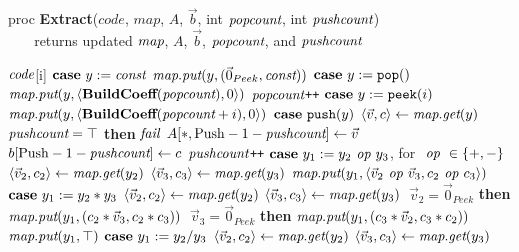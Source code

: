 \begin{algorithm}
proc {\bf Extract}($code$, $map$, $A$, $\vec b$, int $\mbox{\it popcount}$, int $\mbox{\it pushcount}$) \\
\verb+   + returns updated $\mbox{\it map}$, $A$, ${\vec b}$, $\mbox{\it popcount}$, and $\mbox{\it pushcount}$ \\ \vspace{-12pt}
\begin{algorithmic}
 $\mbox{\it code}$[i]
\IND
\STATE $\mbox{\bf case}~y := \mbox{\it const}$
\IND
\STATE $\mbox{\it map}.\mbox{\it put}(y, (\vec 0_{Peek}, \mbox{\it const}))$
\UND
\STATE \vspace{-6pt}
\STATE $\mbox{\bf case}~y := \mbox{\tt pop}()$
\IND
\STATE $\mbox{\it map}.\mbox{\it put}(y, \langle{\mbox{\bf BuildCoeff}(\mbox{\it popcount})}, {0}\rangle)$
\STATE $\mbox{\it popcount}$\verb|++|
\UND
\STATE \vspace{-6pt}
\STATE $\mbox{\bf case}~y := \mbox{\tt peek}(i)$
\IND
\STATE $\mbox{\it map}.\mbox{\it put}(y, \langle{\mbox{\bf BuildCoeff}(\mbox{\it popcount}+i)}, {0}\rangle)$
\UND
\STATE \vspace{-6pt}
\STATE $\mbox{\bf case}~\mbox{\tt push}(y)$
\IND
\STATE $\langle{\vec v}, {c}\rangle \leftarrow \mbox{\it map}.\mbox{\it get}(y)$
 $\mbox{\it pushcount} = \top$ {\bf then} $\mbox{\it fail}$
\STATE $A[*, \mbox{Push} - 1 - \mbox{\it pushcount}] \leftarrow \vec v$
\STATE $b[\mbox{Push} - 1 - \mbox{\it pushcount}] \leftarrow c$
\STATE $\mbox{\it pushcount}$\verb|++|
\UND
\STATE \vspace{-6pt}
\STATE $\mbox{\bf case}~ y_1 := y_2 \mbox{\it ~op~} y_3$, for $\mbox{\it ~op~} \in \{+, -\}$
\IND
\STATE $\langle{\vec v_2}, {c_2}\rangle \leftarrow \mbox{\it map}.\mbox{\it get}(y_2)$
\STATE $\langle{\vec v_3}, {c_3}\rangle \leftarrow \mbox{\it map}.\mbox{\it get}(y_3)$
\STATE $\mbox{\it map}.\mbox{\it put}(y_1, \langle{\vec v_2 \mbox{\it ~op~} \vec v_3}, {c_2 \mbox{\it ~op~} c_3}\rangle)$
\UND
\STATE \vspace{-6pt}
\STATE $\mbox{\bf case}~y_1 := y_2 * y_3$
\IND
\STATE $\langle{\vec v_2}, {c_2}\rangle \leftarrow \mbox{\it map}.\mbox{\it get}(y_2)$
\STATE $\langle{\vec v_3}, {c_3}\rangle \leftarrow \mbox{\it map}.\mbox{\it get}(y_3)$
 $~\vec v_2 = \vec 0_{Peek}$ {\bf then}
\IND
\STATE $\mbox{\it map}.\mbox{\it put}(y_1, (c_2*\vec v_3, c_2*c_3))$
\UND
{} $~\vec v_3=\vec 0_{Peek}$ {\bf then}
\IND
\STATE $\mbox{\it map}.\mbox{\it put}(y_1, (c_3*\vec v_2, c_3*c_2))$
\UND
{}
\IND
\STATE $\mbox{\it map}.\mbox{\it put}(y_1, \top)$
\UND
\UND
\STATE \vspace{-6pt}
\STATE $\mbox{\bf case}~y_1 := y_2 / y_3$
\IND
\STATE $\langle{\vec v_2}, {c_2}\rangle \leftarrow \mbox{\it map}.\mbox{\it get}(y_2)$
\STATE $\langle{\vec v_3}, {c_3}\rangle \leftarrow \mbox{\it map}.\mbox{\it get}(y_3)$

\end{algorithmic}
\end{algorithm}
